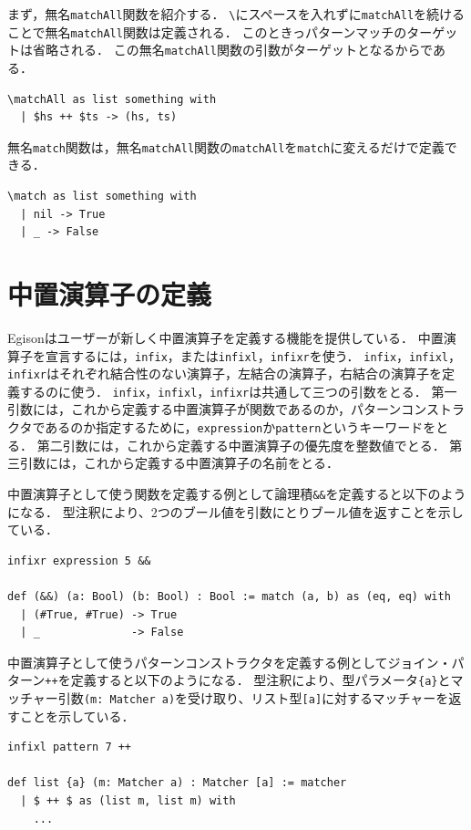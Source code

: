 まず，無名\lstinline{matchAll}関数を紹介する．
\lstinline{\}にスペースを入れずに\lstinline{matchAll}を続けることで無名\lstinline{matchAll}関数は定義される．
このときっパターンマッチのターゲットは省略される．
この無名\lstinline{matchAll}関数の引数がターゲットとなるからである．
\begin{lstlisting}[language=egison,numbers=none]
\matchAll as list something with
  | $hs ++ $ts -> (hs, ts)
\end{lstlisting}

無名\lstinline{match}関数は，無名\lstinline{matchAll}関数の\lstinline{matchAll}を\lstinline{match}に変えるだけで定義できる．
\begin{lstlisting}[language=egison,numbers=none]
\match as list something with
  | nil -> True
  | _ -> False
\end{lstlisting}

\section{中置演算子の定義}

Egisonはユーザーが新しく中置演算子を定義する機能を提供している．
中置演算子を宣言するには，\lstinline{infix}，または\lstinline{infixl}，\lstinline{infixr}を使う．
\lstinline{infix}，\lstinline{infixl}，\lstinline{infixr}はそれぞれ結合性のない演算子，左結合の演算子，右結合の演算子を定義するのに使う．
\lstinline{infix}，\lstinline{infixl}，\lstinline{infixr}は共通して三つの引数をとる．
第一引数には，これから定義する中置演算子が関数であるのか，パターンコンストラクタであるのか指定するために，\lstinline{expression}か\lstinline{pattern}というキーワードをとる．
第二引数には，これから定義する中置演算子の優先度を整数値でとる．
第三引数には，これから定義する中置演算子の名前をとる．

中置演算子として使う関数を定義する例として論理積\lstinline{&&}を定義すると以下のようになる．
型注釈により、2つのブール値を引数にとりブール値を返すことを示している．
\begin{lstlisting}[language=egison,numbers=none]
infixr expression 5 &&

def (&&) (a: Bool) (b: Bool) : Bool := match (a, b) as (eq, eq) with
  | (#True, #True) -> True
  | _              -> False
\end{lstlisting}

中置演算子として使うパターンコンストラクタを定義する例としてジョイン・パターン\lstinline{++}を定義すると以下のようになる．
型注釈により、型パラメータ\lstinline|{a}|とマッチャー引数\lstinline|(m: Matcher a)|を受け取り、リスト型\lstinline|[a]|に対するマッチャーを返すことを示している．
\begin{lstlisting}[language=egison,numbers=none]
infixl pattern 7 ++

def list {a} (m: Matcher a) : Matcher [a] := matcher
  | $ ++ $ as (list m, list m) with
    ...
\end{lstlisting}

